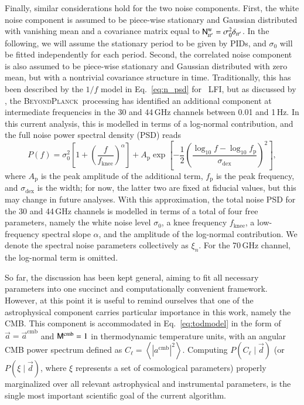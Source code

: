 \documentclass[twocolumn]{aa}
\renewcommand{\d}[0]{\vec{d}}
\renewcommand{\a}[0]{\vec{a}}
\newcommand{\N}[0]{\tens{N}}
\newcommand{\M}[0]{\tens{M}}
\newcommand{\BP}{\textsc{BeyondPlanck}}
\begin{document}
Finally, similar considerations hold for the two noise
components. First, the white noise component is assumed to be
piece-wise stationary and Gaussian distributed with vanishing mean and
a covariance matrix equal to $\N^{\mathrm{w}}_{tt'}=\sigma_0^2
\delta_{tt'}$. In the following, we will assume the stationary period
to be given by PIDs, and $\sigma_0$ will be fitted independently for
each period. Second, the correlated noise component is also assumed to
be piece-wise stationary and Gaussian distributed with zero mean, but
with a nontrivial covariance structure in time. Traditionally, this
has been described by the $1/f$ model in Eq.~\eqref{eq:n_psd} for
\Planck\ LFI, but as discussed by \citet{bp06}, the \BP\ processing
has identified an additional component at intermediate frequencies in
the 30 and 44\,GHz channels between 0.01 and 1\,Hz. In this current
analysis, this is modelled in terms of a log-normal contribution, and the full noise power spectral density (PSD) reads
\begin{equation}
        P(f) = \sigma_0^2\left[1 +
          \left(\frac{f}{f_\mathrm{knee}}\right)^\alpha\right] +
        A_\mathrm{p} \exp\left[-\frac{1}{2}\left(\frac{\log_{10}f -
            \log_{10}
            f_\mathrm{p}}{\sigma_\mathrm{dex}}\right)^2\right],
        \label{eq:1fmodel_lognorm}
\end{equation} 
where $A_\mathrm{p}$ is the peak amplitude of the additional term,
$f_\mathrm{p}$ is the peak frequency, and $\sigma_\mathrm{dex}$ is the
width; for now, the latter two are fixed at fiducial values, but this
may change in future analyses.  With this approximation, the total
noise PSD for the 30 and 44\,GHz channels is modelled in terms of a
total of four free parameters, namely the white noise level
$\sigma_0$, a knee frequency $f_{\mathrm{knee}}$, a low-frequency
spectral slope $\alpha$, and the amplitude of the log-normal
contribution. We denote the spectral noise parameters collectively as
$\xi_n$. For the 70\,GHz channel, the log-normal term is omitted.

So far, the discussion has been kept general, aiming to fit all
necessary parameters into one succinct and computationally convenient
framework. However, at this point it is useful to remind ourselves
that one of the astrophysical component carries particular importance
in this work, namely the CMB. This component is accommodated in
Eq.~\eqref{eq:todmodel} in the form of $\a = \a^{\mathrm{cmb}}$ and
$\M^{\mathrm{cmb}} = 1$ in thermodynamic temperature units, with an
angular CMB power spectrum defined as $C_{\ell} = \left<
|a^{\mathrm{cmb}}|^2\right>$. Computing $P(C_{\ell}\mid \d)$ (or
$P(\xi\mid \d)$, where $\xi$ represents a set of cosmological parameters)
properly marginalized over all relevant astrophysical and instrumental
parameters, is the single most important scientific goal of the
current algorithm.
\end{document}
